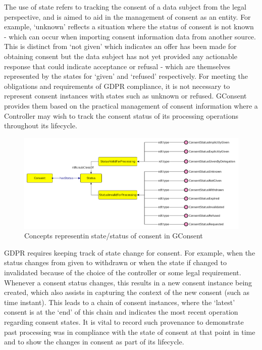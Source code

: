 The use of state refers to tracking the consent of a data subject from the legal perspective, and is aimed to aid in the management of consent as an entity. For example, `unknown' reflects a situation where the status of consent is not known - which can occur when importing consent information data from another source.
This is distinct from `not given' which indicates an offer has been made for obtaining consent but the data subject has not yet provided any actionable response that could indicate acceptance or refusal - which are themselves represented by the states for `given' and `refused' respectively.
For meeting the obligations and requirements of GDPR compliance, it is not necessary to represent consent instances with states such as unknown or refused.
GConsent provides them based on the practical management of consent information where a Controller may wish to track the consent status of its processing operations throughout its lifecycle.
\begin{figure}[htbp]
    \centering
    \includegraphics[width=\linewidth]{img/gconsent_status.png}
    \caption{Concepts representin state/status of consent in GConsent \cite{pandit_gconsent_2019}}
    \label{fig:vocabs:gconsent-status}
\end{figure}

GDPR requires keeping track of state change for consent. For example, when the status changes from given to withdrawn or when the state if changed to invalidated because of the choice of the controller or some legal requirement. Whenever a consent status changes, this results in a new consent instance being created, which also assists in capturing the context of the new consent (such as time instant). This leads to a chain of consent instances, where the `latest' consent is at the `end' of this chain and indicates the most recent operation regarding consent states. It is vital to record such provenance to demonstrate past processing was in compliance with the state of consent at that point in time and to show the changes in consent as part of its lifecycle.

